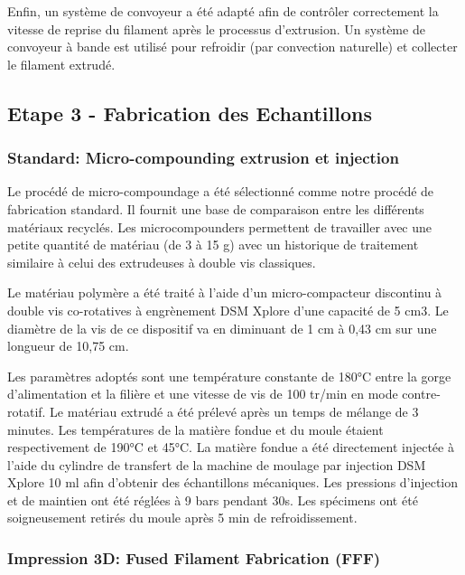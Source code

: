 \documentclass[
]{article}
\begin{document}
Enfin, un système de convoyeur a été adapté afin de contrôler
correctement la vitesse de reprise du filament après le processus
d'extrusion. Un système de convoyeur à bande est utilisé pour refroidir
(par convection naturelle) et collecter le filament extrudé.

\hypertarget{etape-3---fabrication-des-echantillons}{%
\subsection{Etape 3 - Fabrication des
Echantillons}\label{etape-3---fabrication-des-echantillons}}

\hypertarget{standard-micro-compounding-extrusion-et-injection}{%
\subsubsection{Standard: Micro-compounding extrusion et
injection}\label{standard-micro-compounding-extrusion-et-injection}}

Le procédé de micro-compoundage a été sélectionné comme notre procédé de
fabrication standard. Il fournit une base de comparaison entre les
différents matériaux recyclés. Les microcompounders permettent de
travailler avec une petite quantité de matériau (de 3 à 15 g) avec un
historique de traitement similaire à celui des extrudeuses à double vis
classiques.

Le matériau polymère a été traité à l'aide d'un micro-compacteur
discontinu à double vis co-rotatives à engrènement DSM Xplore d'une
capacité de 5 cm3. Le diamètre de la vis de ce dispositif va en
diminuant de 1 cm à 0,43 cm sur une longueur de 10,75 cm.

Les paramètres adoptés sont une température constante de 180°C entre la
gorge d'alimentation et la filière et une vitesse de vis de 100 tr/min
en mode contre-rotatif. Le matériau extrudé a été prélevé après un temps
de mélange de 3 minutes. Les températures de la matière fondue et du
moule étaient respectivement de 190°C et 45°C. La matière fondue a été
directement injectée à l'aide du cylindre de transfert de la machine de
moulage par injection DSM Xplore 10 ml afin d'obtenir des échantillons
mécaniques. Les pressions d'injection et de maintien ont été réglées à 9
bars pendant 30s. Les spécimens ont été soigneusement retirés du moule
après 5 min de refroidissement.

\hypertarget{impression-3d-fused-filament-fabrication-fff}{%
\subsubsection{Impression 3D: Fused Filament Fabrication
(FFF)}\label{impression-3d-fused-filament-fabrication-fff}}
\end{document}
